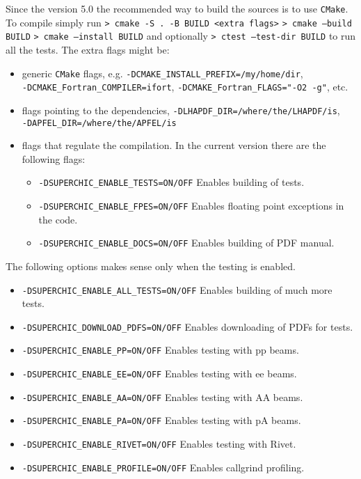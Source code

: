 \documentclass[12pt]{article}
\begin{document}
Since the version 5.0 the recommended way to build the sources is to use \texttt{CMake}. To compile simply run
\newline
\newline
\texttt{> cmake -S . -B BUILD <extra flags>}
\newline
\texttt{> cmake --build BUILD}
\newline
\texttt{> cmake --install BUILD}
\newline
\newline
and optionally
\newline
\newline
\texttt{> ctest --test-dir BUILD}
\newline
\newline
to run all the tests. The extra flags might be:
\begin{itemize}
\item  generic \texttt{CMake} flags, e.g. \texttt{-DCMAKE\_INSTALL\_PREFIX=/my/home/dir},\\ \texttt{-DCMAKE\_Fortran\_COMPILER=ifort}, \texttt{-DCMAKE\_Fortran\_FLAGS="-O2 -g"}, etc.
\item  flags pointing to the dependencies, \texttt{-DLHAPDF\_DIR=/where/the/LHAPDF/is}, \\\texttt{-DAPFEL\_DIR=/where/the/APFEL/is}
\item  {flags that regulate the compilation. In the current version there are the following flags: \begin{itemize}
 \item  \texttt{-DSUPERCHIC\_ENABLE\_TESTS=ON/OFF}     Enables building of tests.
 \item  \texttt{-DSUPERCHIC\_ENABLE\_FPES=ON/OFF}      Enables floating point exceptions in the code.
 \item  \texttt{-DSUPERCHIC\_ENABLE\_DOCS=ON/OFF}      Enables building of PDF manual. 
 \end{itemize}}
 \end{itemize}
 The following options makes sense only when the testing is enabled.
 \begin{itemize}
 \item \texttt{-DSUPERCHIC\_ENABLE\_ALL\_TESTS=ON/OFF} Enables building of much more tests.
 \item  \texttt{-DSUPERCHIC\_DOWNLOAD\_PDFS=ON/OFF}    Enables downloading of PDFs for tests. 
 \item    \texttt{-DSUPERCHIC\_ENABLE\_PP=ON/OFF}        Enables testing with pp beams.
 \item  \texttt{-DSUPERCHIC\_ENABLE\_EE=ON/OFF}        Enables testing with ee beams.
 \item  \texttt{-DSUPERCHIC\_ENABLE\_AA=ON/OFF}        Enables testing with AA beams.
 \item  \texttt{-DSUPERCHIC\_ENABLE\_PA=ON/OFF}        Enables testing with pA beams. 
 \item  \texttt{-DSUPERCHIC\_ENABLE\_RIVET=ON/OFF}     Enables testing with Rivet.
 \item  \texttt{-DSUPERCHIC\_ENABLE\_PROFILE=ON/OFF}   Enables callgrind profiling.
\end{itemize}
\end{document}
